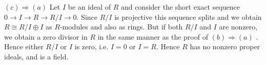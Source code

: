 \documentclass[11pt]{article}
\begin{document}
$(c)\Rightarrow (a)$ Let $I$ be an ideal of $R$ and consider the short exact sequence $0\to I \to R \to R/I \to 0$. Since $R/I$ is projective this sequence splits and we obtain $R\cong R/I \oplus I$ as $R$-modules and also as rings. But if both $R/I$ and $I$ are nonzero, we obtain a zero divisor in $R$ in the same manner as the proof of $(b)\Rightarrow (a)$ . Hence either $R/I$ or $I$ is zero, i.e. $I = 0$ or $I= R$. Hence $R$ has no nonzero proper ideals, and is a field. 
\end{document}

